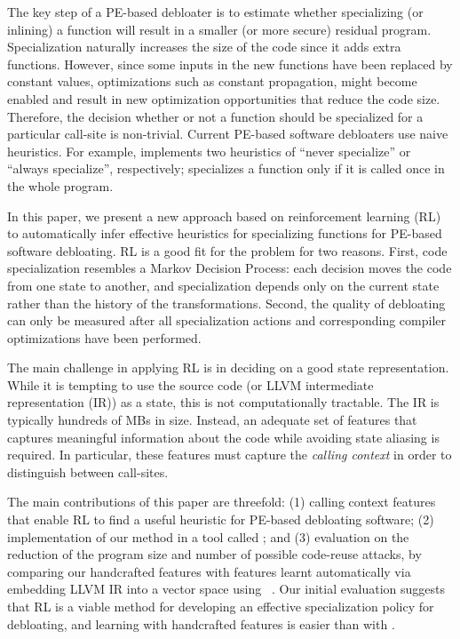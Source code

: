 The key step of a PE-based debloater is to estimate whether specializing (or
inlining) a function will result in a smaller (or more secure) residual program.
Specialization naturally increases the size of the code since it adds extra
functions. However, since some inputs in the new functions have been replaced by
constant values, optimizations such as constant propagation, might become
enabled and result in new optimization opportunities that reduce the code size.
Therefore, the decision whether or not a function should be specialized for a
particular call-site is non-trivial. %
Current PE-based software debloaters use naive heuristics. For example, \occam
implements two heuristics of ``never specialize'' or ``always specialize'',
respectively; \trimmer specializes a function only if it is called once in the
whole program. 

In this paper, we present a new approach based on reinforcement
learning (RL) to automatically infer effective heuristics for
specializing functions for PE-based software debloating. RL is a good
fit for the problem for two reasons. First, code specialization
resembles a Markov Decision Process: each decision moves the code from
one state to another, and specialization depends only on the current
state rather than the history of the transformations.  Second, the
quality of debloating can only be measured after all specialization
actions and corresponding compiler optimizations have been
performed. %

The main challenge in applying RL is in deciding on a good state
representation.  While it is tempting to use the source code (or LLVM
intermediate representation (IR)) as a state, this is not
computationally tractable. The IR is typically hundreds of MBs in
size. Instead, an adequate set of features that captures meaningful
information about the code while avoiding state aliasing is
required. In particular, these features must capture the \emph{calling context}
in order to distinguish between call-sites.

The main contributions of this paper are threefold: (1) calling
context features that enable RL to find a useful heuristic for
PE-based debloating software; (2) implementation of our method in a
tool called \doccam; and (3) evaluation on the reduction of the
program size and number of possible code-reuse attacks, by comparing
our handcrafted features with features learnt automatically via
embedding LLVM IR into a vector space using \insttovec~\cite{inst2vec}.
%
Our initial evaluation suggests that RL is a viable method for
developing an effective specialization policy for debloating, and learning with
handcrafted features is easier than with \insttovec.



